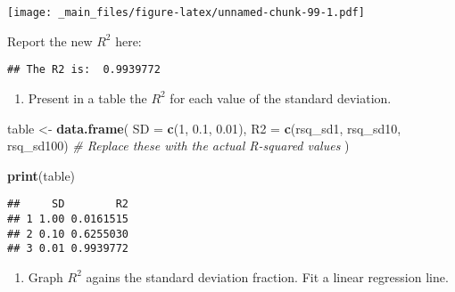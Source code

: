 \documentclass[
]{book}
\newenvironment{Shaded}{\begin{snugshade}}{\end{snugshade}}
\newcommand{\AttributeTok}[1]{\textcolor[rgb]{0.13,0.29,0.53}{#1}}
\newcommand{\CommentTok}[1]{\textcolor[rgb]{0.56,0.35,0.01}{\textit{#1}}}
\newcommand{\DecValTok}[1]{\textcolor[rgb]{0.00,0.00,0.81}{#1}}
\newcommand{\FloatTok}[1]{\textcolor[rgb]{0.00,0.00,0.81}{#1}}
\newcommand{\FunctionTok}[1]{\textcolor[rgb]{0.13,0.29,0.53}{\textbf{#1}}}
\newcommand{\NormalTok}[1]{#1}
\newcommand{\OtherTok}[1]{\textcolor[rgb]{0.56,0.35,0.01}{#1}}
\newcommand{\SpecialCharTok}[1]{\textcolor[rgb]{0.81,0.36,0.00}{\textbf{#1}}}
\newcommand{\StringTok}[1]{\textcolor[rgb]{0.31,0.60,0.02}{#1}}
\providecommand{\tightlist}{%
  \setlength{\itemsep}{0pt}\setlength{\parskip}{0pt}}
\begin{document}
\texttt{[image: \_main\_files/figure-latex/unnamed-chunk-99-1.pdf]}

Report the new \(R^2\) here:

\begin{Shaded}
\end{Shaded}

\begin{verbatim}
## The R2 is:  0.9939772
\end{verbatim}

\begin{enumerate}
\def\labelenumi{\arabic{enumi}.}
\setcounter{enumi}{8}
\tightlist
\item
  Present in a table the \(R^2\) for each value of the standard deviation.
\end{enumerate}

\begin{Shaded}
\begin{Highlighting}[]
\NormalTok{table }\OtherTok{\textless{}{-}} \FunctionTok{data.frame}\NormalTok{(}
  \AttributeTok{SD =} \FunctionTok{c}\NormalTok{(}\DecValTok{1}\NormalTok{, }\FloatTok{0.1}\NormalTok{, }\FloatTok{0.01}\NormalTok{),}
  \AttributeTok{R2 =} \FunctionTok{c}\NormalTok{(rsq\_sd1, rsq\_sd10, rsq\_sd100)    }\CommentTok{\# Replace these with the actual R{-}squared values}
\NormalTok{)}

\FunctionTok{print}\NormalTok{(table)}
\end{Highlighting}
\end{Shaded}

\begin{verbatim}
##     SD        R2
## 1 1.00 0.0161515
## 2 0.10 0.6255030
## 3 0.01 0.9939772
\end{verbatim}

\begin{enumerate}
\def\labelenumi{\arabic{enumi}.}
\setcounter{enumi}{9}
\tightlist
\item
  Graph \(R^2\) agains the standard deviation fraction. Fit a linear regression line.
\end{enumerate}
\end{document}

